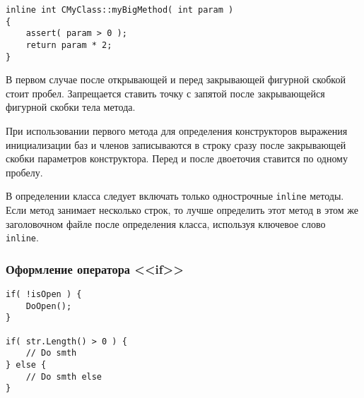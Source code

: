 \begin{lstlisting}[frame=single]
inline int CMyClass::myBigMethod( int param )
{
    assert( param > 0 );
    return param * 2;
}
\end{lstlisting}

В первом случае после открывающей и перед закрывающей фигурной скобкой стоит пробел. Запрещается ставить точку с запятой после закрывающейся фигурной скобки тела метода.

При использовании первого метода для определения конструкторов выражения инициализации баз и членов  записываются в строку сразу после закрывающей скобки параметров конструктора. Перед и после двоеточия ставится по одному пробелу.

В определении класса следует включать только однострочные \lstinline|inline| методы. Если метод занимает несколько строк, то лучше определить этот метод в этом же заголовочном файле после определения класса, используя ключевое слово \lstinline|inline|.

\newpage
\subsubsection{Оформление оператора <<if>>}

\begin{lstlisting}[frame=single]
if( !isOpen ) {
    DoOpen();
}

if( str.Length() > 0 ) {
    // Do smth
} else {
    // Do smth else
}
\end{lstlisting}

